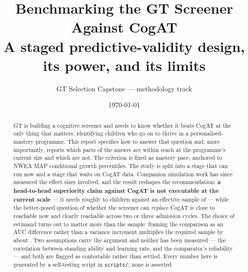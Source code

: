 \documentclass[11pt,a4paper]{article}
\title{\textbf{Benchmarking the GT Screener Against CogAT}\\[0.35em]
\large A staged predictive-validity design, its power, and its limits}
\author{GT Selection Capstone --- methodology track}
\date{\today}
\begin{document}
\maketitle

\begin{abstract}
\noindent
GT is building a cognitive screener and needs to know whether it beats CogAT at
the only thing that matters: identifying children who go on to thrive in a
personalised-mastery programme. This report specifies how to answer that
question and, more importantly, reports which parts of the answer are within
reach at the programme's current size and which are not. The criterion is fixed
as mastery pace, anchored to NWEA MAP conditional growth percentiles. The study
is split into a stage that can run now and a stage that waits on CogAT data.
Companion simulation work has since measured the effect sizes involved, and the
result reshapes the recommendation: \textbf{a head-to-head superiority claim
against CogAT is not executable at the current scale} --- it needs roughly
\NsupHi{} to \NsupLo{} children against an effective sample of \EffNboth{} ---
while the better-posed question of whether the screener can \emph{replace}
CogAT is close to reachable now and clearly reachable across two or three
admission cycles. The choice of estimand turns out to matter more than the
sample: framing the comparison as an AUC difference rather than a variance
increment multiplies the required sample by about \AUCpenalty{}. Two assumptions
carry the argument and neither has been measured --- the correlation between
standing ability and learning rate, and the comparator's reliability --- and
both are flagged as contestable rather than settled. Every number here is
generated by a self-testing script in \texttt{scripts/}; none is asserted.
\end{abstract}

\vspace{-0.4em}

\end{document}
